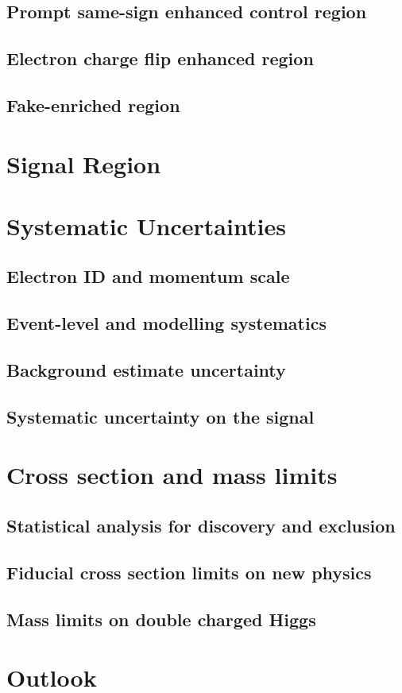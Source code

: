 \subsection{Prompt same-sign enhanced control region}
\subsection{Electron charge flip enhanced region}
\subsection{Fake-enriched region}

\section{Signal Region}
\label{sec:wprimeSignalRegion}

\section{Systematic Uncertainties}
\label{sec:wprimeSystematics}
\subsection{Electron ID and momentum scale}
\subsection{Event-level and modelling systematics}
\subsection{Background estimate uncertainty}
\subsection{Systematic uncertainty on the signal}

\section{Cross section and mass limits}
\subsection{Statistical analysis for discovery and exclusion}
\subsection{Fiducial cross section limits on new physics}
\subsection{Mass limits on double charged Higgs}

\section{Outlook}
\label{sec:wprimeConclusion}

